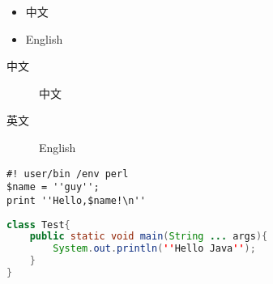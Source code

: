 \documentclass[UTF8]{ctexart}
\begin{document}
\begin{itemize}
\item 中文
\item English
\end{itemize}

\begin{description}
\item[中文] 中文
\item[英文] English
\end{description}

\begin{verbatim}
#! user/bin /env perl
$name = ''guy'';
print ''Hello,$name!\n''
\end{verbatim}

\begin{lstlisting}[language=java]
class Test{
	public static void main(String ... args){
		System.out.println(''Hello Java'');
	}
}
\end{lstlisting}
\end{document}
